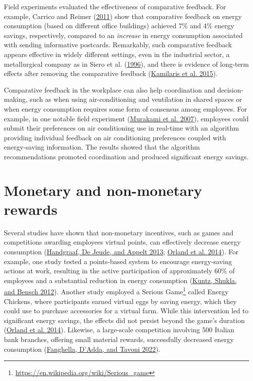 \documentclass[
  12pt,
  captions=heading]{scrreport}
\DeclareRobustCommand{\href}[2]{#2\footnote{\url{#1}}}
\begin{document}
Field experiments evaluated the effectiveness of comparative feedback.
For example, Carrico and Reimer
(\protect\hyperlink{ref-carrico2011motivating}{2011}) show that
comparative feedback on energy consumption (based on different office
buildings) achieved 7\% and 4\% energy savings, respectively, compared
to an \emph{increase} in energy consumption associated with sending
informative postcards. Remarkably, such comparative feedback appears
effective in widely different settings, even in the industrial sector, a
metallurgical company as in Siero et al.
(\protect\hyperlink{ref-siero1996changing}{1996}), and there is evidence
of long-term effects after removing the comparative feedback
(\protect\hyperlink{ref-kamilaris2015case}{Kamilaris et al. 2015}).

Comparative feedback in the workplace can also help coordination and
decision-making, such as when using air-conditioning and ventilation in
shared spaces or when energy consumption requires some form of consensus
among employees. For example, in one notable field experiment
(\protect\hyperlink{ref-murakami2007field}{Murakami et al. 2007}),
employees could submit their preferences on air conditioning use in
real-time with an algorithm providing individual feedback on air
conditioning preferences coupled with energy-saving information. The
results showed that the algorithm recommendations promoted coordination
and produced significant energy savings.

\hypertarget{monetary-and-non-monetary-rewards}{%
\section{Monetary and non-monetary
rewards}\label{monetary-and-non-monetary-rewards}}

Several studies have shown that non-monetary incentives, such as games
and competitions awarding employees virtual points, can effectively
decrease energy consumption
(\protect\hyperlink{ref-handgraaf2013public}{Handgraaf, De Jeude, and
Appelt 2013}; \protect\hyperlink{ref-orland2014saving}{Orland et al.
2014}). For example, one study tested a points-based system to encourage
energy-saving actions at work, resulting in the active participation of
approximately 60\% of employees and a substantial reduction in energy
consumption (\protect\hyperlink{ref-kuntz2012many}{Kuntz, Shukla, and
Bensch 2012}). Another study employed a
\href{https://en.wikipedia.org/wiki/Serious_game}{Serious Game} called
Energy Chickens, where participants earned virtual eggs by saving
energy, which they could use to purchase accessories for a virtual farm.
While this intervention led to significant energy savings, the effects
did not persist beyond the game's duration
(\protect\hyperlink{ref-orland2014saving}{Orland et al. 2014}).
Likewise, a large-scale competition involving 500 Italian bank branches,
offering small material rewards, successfully decreased energy
consumption (\protect\hyperlink{ref-fanghella2022evaluating}{Fanghella,
D'Adda, and Tavoni 2022}).
\end{document}
